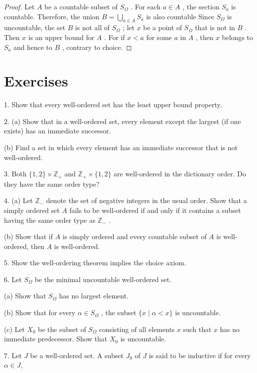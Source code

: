 \begin{proof}Let \(A\) be a countable subset of \({S}_{\Omega }\) . For each \(a \in  A\) , the section \({S}_{a}\) is countable. Therefore, the union \(B = \mathop{\bigcup }\limits_{{a \in  A}}{S}_{a}\) is also countable Since \({S}_{\Omega }\) is uncountable, the set \(B\) is not all of \({S}_{\Omega }\) ; let \(x\) be a point of \({S}_{\Omega }\) that is not in \(B\) . Then \(x\) is an upper bound for \(A\) . For if \(x < a\) for some \(a\) in \(A\) , then \(x\) belongs to \({S}_{a}\) and hence to \(B\) , contrary to choice.\end{proof}
\section*{Exercises}

1. Show that every well-ordered set has the least upper bound property.

2. (a) Show that in a well-ordered set, every element except the largest (if one exists) has an immediate successor.

(b) Find a set in which every element has an immediate successor that is not well-ordered.

3. Both \(\{ 1,2\}  \times  {\mathbb{Z}}_{ + }\) and \({\mathbb{Z}}_{ + } \times  \{ 1,2\}\) are well-ordered in the dictionary order. Do they have the same order type?

4. (a) Let \({\mathbb{Z}}_{ - }\) denote the set of negative integers in the usual order. Show that a simply ordered set \(A\) fails to be well-ordered if and only if it contains a subset having the same order type as \({\mathbb{Z}}_{ - }\) .

(b) Show that if \(A\) is simply ordered and every countable subset of \(A\) is well-ordered, then \(A\) is well-ordered.

5. Show the well-ordering theorem implies the choice axiom.

6. Let \({S}_{\Omega }\) be the minimal uncountable well-ordered set.

(a) Show that \({S}_{\Omega }\) has no largest element.

(b) Show that for every \(\alpha  \in  {S}_{\Omega }\) , the subset \(\{ x \mid  \alpha  < x\}\) is uncountable.

(c) Let \({X}_{0}\) be the subset of \({S}_{\Omega }\) consisting of all elements \(x\) such that \(x\) has no immediate predecessor. Show that \({X}_{0}\) is uncountable.

7. Let \(J\) be a well-ordered set. A subset \({J}_{0}\) of \(J\) is said to be inductive if for every \(\alpha  \in  J,\)

